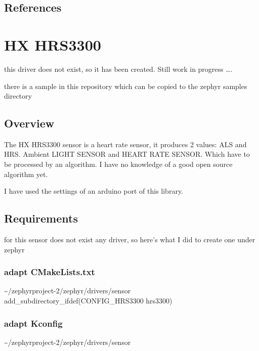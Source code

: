 \documentclass[letterpaper,10pt,english]{sphinxmanual}
\begin{document}
\subsection{References}
\label{\detokenize{drivers/cst816s:references}}

\section{HX HRS3300}
\label{\detokenize{drivers/hrs3300:hx-hrs3300}}\label{\detokenize{drivers/hrs3300::doc}}
this driver does not exist, so it has been created.
Still work in progress ….

there is a sample in this repository which can be copied to the zephyr samples directory

\begin{sphinxVerbatim}[commandchars=\\\{\}]
\end{sphinxVerbatim}


\subsection{Overview}
\label{\detokenize{drivers/hrs3300:overview}}
The HX HRS3300 sensor is a heart rate sensor, it produces 2 values: ALS and HRS. Ambient LIGHT SENSOR and HEART RATE SENSOR. Which have to be processed by an algorithm. I have no knowledge of a good open source algorithm yet.

I have used the settings of an arduino port of this library.

\noindent{}


\subsection{Requirements}
\label{\detokenize{drivers/hrs3300:requirements}}
for this sensor does not exist any driver, so here’s what I did to create one under zephyr


\subsubsection{adapt CMakeLists.txt}
\label{\detokenize{drivers/hrs3300:adapt-cmakelists-txt}}
\textasciitilde{}/zephyrproject-2/zephyr/drivers/sensor
add\_subdirectory\_ifdef(CONFIG\_HRS3300           hrs3300)


\subsubsection{adapt Kconfig}
\label{\detokenize{drivers/hrs3300:adapt-kconfig}}
\textasciitilde{}/zephyrproject-2/zephyr/drivers/sensor
\end{document}
